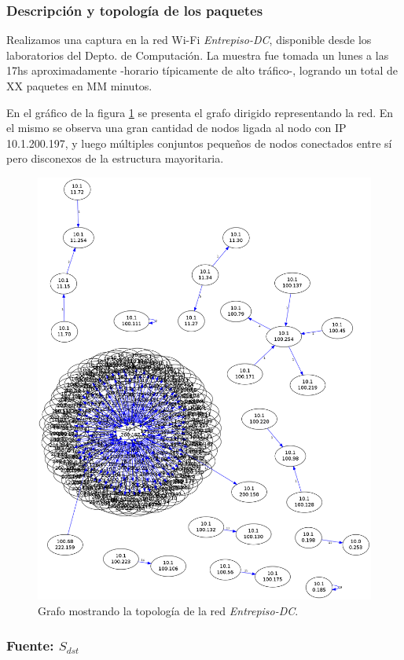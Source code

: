 \subsubsection{Descripción y topología de los paquetes}

Realizamos una captura en la red Wi-Fi \emph{Entrepiso-DC}, disponible desde los laboratorios del Depto. de Computación. La muestra fue tomada un lunes a las 17hs aproximadamente -horario típicamente de alto tráfico-, logrando un total de XX paquetes en MM minutos.

En el gráfico de la figura \ref{fig:entrepiso-dc-grafo} se presenta el grafo dirigido representando la red. En el mismo se observa una gran cantidad de nodos ligada al nodo con IP 10.1.200.197, y luego múltiples conjuntos pequeños de nodos conectados entre sí pero disconexos de la estructura mayoritaria.

\begin{figure}[H]
  \begin{center}
    \includegraphics[width=0.6\linewidth]{../imgs/red-entrepiso-dc_red.png}
    \caption{Grafo mostrando la topología de la red \emph{Entrepiso-DC}.}
    \label{fig:entrepiso-dc-grafo}
  \end{center}
\end{figure}

\subsubsection{Fuente: $S_{dst}$}

